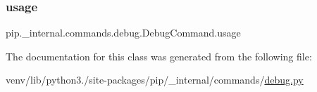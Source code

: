 \mbox{\label{classpip_1_1__internal_1_1commands_1_1debug_1_1DebugCommand_a529ecbda41c52373a77e43136d36f838}} 
\subsubsection{\texorpdfstring{usage}{usage}}
{\footnotesize\ttfamily pip.\+\_\+internal.\+commands.\+debug.\+Debug\+Command.\+usage\hspace{0.3cm}{\ttfamily [static]}}



The documentation for this class was generated from the following file\+:\begin{DoxyCompactItemize}
\item 
venv/lib/python3./site-\/packages/pip/\+\_\+internal/commands/\hyperlink{pip_2__internal_2commands_2debug_8py}{debug.\+py}\end{DoxyCompactItemize}
